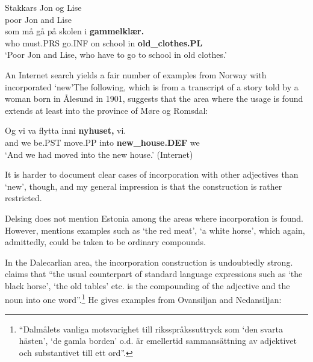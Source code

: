 \ea\label{}
\gll Stakkars  Jon  og  Lise\\
poor  Jon  and  Lise\\
\gll som  må  gå  på  skolen  i  \textbf{gammelklær.}\\
who  must.PRS  go.INF  on  school  in  \textbf{old\_clothes.PL}\\
\glt ‘Poor Jon and Lise, who have to go to school in old clothes.’
\z

An Internet search yields a fair number of examples from Norway with incorporated  ‘new’The following, which is from a transcript of a story told by a woman born in Ålesund in 1901, suggests that the area where the usage is found extends at least into the province of Møre og Romsdal:


\ea\label{}
\gll Og  vi  va  flytta  inni  \textbf{nyhuset,} vi.  \\
and  we  be.PST  move.PP  into  \textbf{new\_house.DEF} we  \\
\glt ‘And we had moved into the new house.’ (Internet)
\z

It is harder to document clear cases of incorporation with other adjectives than  ‘new’, though, and my general impression is that the construction is rather restricted.


Delsing does not mention Estonia among the areas where incorporation is found. However, \citet[98]{Tiberg1962} mentions examples such as  ‘the red meat’,  ‘a white horse’, which again, admittedly, could be taken to be ordinary compounds.


In the Dalecarlian area, the incorporation construction is undoubtedly strong. \citet[148]{Levander1928} claims that “the usual counterpart of standard language expressions such as ‘the black horse’, ‘the old tables’ etc. is the compounding of the adjective and the noun into one word”.\footnote{ “Dalmålets vanliga motsvarighet till riksspråkssuttryck som ‘den svarta hästen’, ‘de gamla borden’ o.d. är emellertid sammansättning av adjektivet och substantivet till ett ord”.} He gives examples from Ovansiljan and Nedansiljan: 

